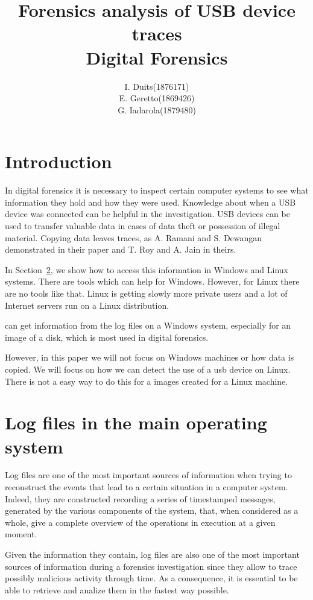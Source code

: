 \documentclass[a4paper]{article}
\title{Forensics analysis of USB device traces\\
\large Digital Forensics}
\author{
\begin{tabular}{>{\raggedleft}m{5cm}m{5cm}}
I. Duits & (1876171) \\
E. Geretto & (1869426) \\
G. Iadarola & (1879480) \\
\end{tabular}
}
\begin{document}
\maketitle

\section{Introduction}
In digital forensics it is necessary to inspect certain computer systems to see what information they hold and how they were used. Knowledge about when a USB device was connected can be helpful in the investigation. USB devices can be used to transfer valuable data in cases of data theft or possession of illegal material. Copying data leaves traces, as A. Ramani and S. Dewangan demonstrated in their paper \cite{Abhijeet14} and T. Roy and A. Jain in theirs.~\cite{Tanushree12} 

In Section~\ref{sec:lit}, we show how to access this information in Windows and Linux systems. There are tools which can help for Windows. However, for Linux there are no tools like that. Linux is getting slowly more private users\cite{osShare} and a lot of Internet servers run on a Linux distribution\cite{InternetServer}. 

can get information from the log files on a Windows system, especially for an image of a disk, which is most used in digital forensics. 

However, in this paper we will not focus on Windows machines or how data is copied. We will focus on how we can detect the use of a usb device on Linux. There is not a easy way to do this for a images created for a Linux machine.




\section{Log files in the main operating system}
\label{sec:lit}
Log files are one of the most important sources of information when trying to
reconstruct the events that lead to a certain situation in a computer system.
Indeed, they are constructed recording a series of timestamped messages,
generated by the various components of the system, that, when considered as a
whole, give a complete overview of the operations in execution at a given
moment.

Given the information they contain, log files are also one of the most important
sources of information during a forensics investigation since they allow to
trace possibly malicious activity through time. As a consequence, it is
essential to be able to retrieve and analize them in the fastest way
possible.~\cite{finlayson1987log}
\end{document}
